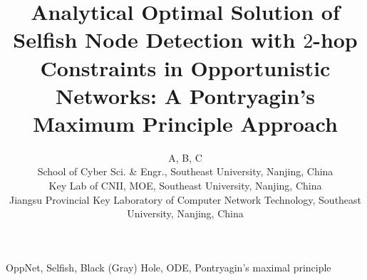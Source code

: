 \documentclass[10pt,conference]{IEEEtran}
\begin{document}
%
\title{
Analytical Optimal Solution of Selfish Node Detection with $2$-hop Constraints in Opportunistic Networks: A Pontryagin's Maximum Principle Approach
}
\author{A, B, C\\
        School of Cyber Sci. \& Engr., Southeast University, Nanjing, China\\
        Key Lab of CNII, MOE, Southeast University, Nanjing, China\\
        Jiangsu Provincial Key Laboratory of Computer Network Technology, Southeast University, Nanjing, China\\
        }
\maketitle

%
\begin{IEEEkeywords}
OppNet, Selfish, Black (Gray) Hole, ODE, Pontryagin's maximal principle
\end{IEEEkeywords}











\end{document}
